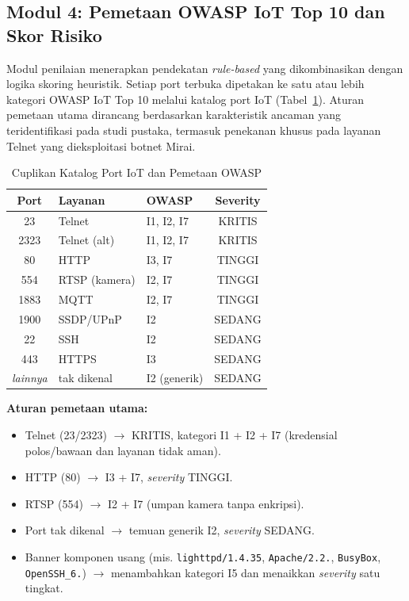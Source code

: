 \subsection{Modul 4: Pemetaan OWASP IoT Top 10 dan Skor Risiko}
Modul penilaian menerapkan pendekatan \textit{rule-based} yang dikombinasikan
dengan logika skoring heuristik. Setiap port terbuka dipetakan ke satu atau
lebih kategori OWASP IoT Top 10 melalui katalog port IoT
(Tabel~\ref{tab:katalog}). Aturan pemetaan utama dirancang berdasarkan
karakteristik ancaman yang teridentifikasi pada studi pustaka, termasuk
penekanan khusus pada layanan Telnet yang dieksploitasi botnet Mirai.

\begin{table}[ht]
    \centering
    \caption{Cuplikan Katalog Port IoT dan Pemetaan OWASP}
    \label{tab:katalog}
    \begin{tabular}{|c|l|l|c|}
        \hline
        \textbf{Port} & \textbf{Layanan} & \textbf{OWASP} &
        \textbf{Severity} \\
        \hline
        23 & Telnet & I1, I2, I7 & KRITIS \\
        2323 & Telnet (alt) & I1, I2, I7 & KRITIS \\
        80 & HTTP & I3, I7 & TINGGI \\
        554 & RTSP (kamera) & I2, I7 & TINGGI \\
        1883 & MQTT & I2, I7 & TINGGI \\
        1900 & SSDP/UPnP & I2 & SEDANG \\
        22 & SSH & I2 & SEDANG \\
        443 & HTTPS & I3 & SEDANG \\
        \hline
        \textit{lainnya} & tak dikenal & I2 (generik) & SEDANG \\
        \hline
    \end{tabular}
\end{table}

\textbf{Aturan pemetaan utama:}
\begin{itemize}
    \item Telnet (23/2323) $\rightarrow$ KRITIS, kategori I1 + I2 + I7
    (kredensial polos/bawaan dan layanan tidak aman).
    \item HTTP (80) $\rightarrow$ I3 + I7, \textit{severity} TINGGI.
    \item RTSP (554) $\rightarrow$ I2 + I7 (umpan kamera tanpa enkripsi).
    \item Port tak dikenal $\rightarrow$ temuan generik I2,
    \textit{severity} SEDANG.
    \item Banner komponen usang (mis. \texttt{lighttpd/1.4.35},
    \texttt{Apache/2.2.}, \texttt{BusyBox}, \texttt{OpenSSH\_6.})
    $\rightarrow$ menambahkan kategori I5 dan menaikkan \textit{severity}
    satu tingkat.
\end{itemize}

